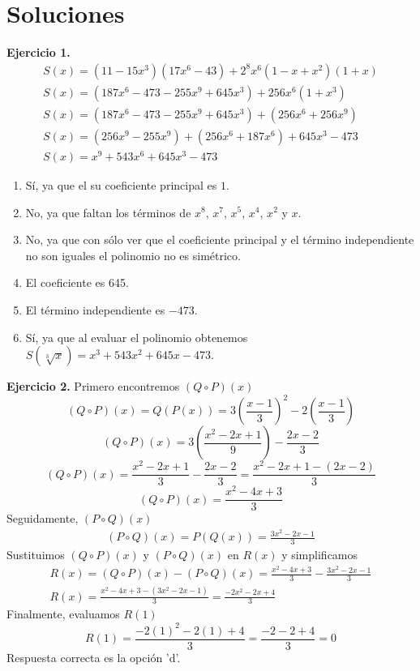 \newpage

\section*{\large Soluciones}
{
    \textbf{Ejercicio 1.}
    \begin{gather*}
        S(x) = (11 - 15x^3)(17x^6 - 43) + 2^8 x^6 (1 - x + x^2)(1 + x)\\
        S(x) = (187 x^6 - 473 - 255x^9 + 645x^3) + 256 x^6 (1 + x^3)\\
        S(x) = (187 x^6 - 473 - 255x^9 + 645x^3) + (256 x^6 + 256 x^9)\\
        S(x) = (256 x^9 - 255x^9) + (256 x^6 + 187 x^6) + 645x^3 - 473\\
        S(x) = x^9 + 543 x^6 + 645x^3 - 473
    \end{gather*}

        \begin{enumerate}
            \item Sí, ya que el su coeficiente principal es $1$.
            \item No, ya que faltan los términos de $x^8$, $x^7$, $x^5$, $x^4$, $x^2$ y $x$.
            \item No, ya que con sólo ver que el coeficiente principal y el término independiente no son iguales el polinomio no es simétrico.
            \item El coeficiente es 645.
            \item El término independiente es $-473$.
            \item Sí, ya que al evaluar el polinomio obtenemos $S(\sqrt[3]{x}) = x^3 + 543 x^2 + 645x - 473$.
        \end{enumerate}

    \textbf{Ejercicio 2.} Primero encontremos $(Q \circ P)(x)$
    \[ (Q \circ P)(x) = Q(P(x)) = 3\left( \frac{x - 1}{3} \right)^2 - 2\left( \frac{x - 1}{3} \right)\]
    \[ (Q \circ P)(x) = 3\left( \frac{x^2 - 2x + 1}{9} \right) - \frac{2x - 2}{3}\]
    \[ (Q \circ P)(x) = \frac{x^2 - 2x + 1}{3} - \frac{2x - 2}{3} = \frac{x^2 - 2x + 1 - (2x - 2)}{3}\]
    \[ (Q \circ P)(x) = \frac{x^2 - 4x + 3}{3}\]
    Seguidamente, $(P \circ Q)(x)$
    \begin{gather*}
        (P \circ Q)(x) = P(Q(x)) = \frac{3x^2 - 2x - 1}{3}
    \end{gather*}
    Sustituimos $(Q \circ P)(x)$ y $(P \circ Q)(x)$ en $R(x)$ y simplificamos
    \begin{gather*}
        R(x) = (Q \circ P)(x) - (P \circ Q)(x) = \frac{x^2 - 4x + 3}{3} -  \frac{3x^2 - 2x - 1}{3}\\
        R(x) = \frac{x^2 - 4x + 3 - (3x^2 - 2x - 1)}{3} = \frac{-2 x^2 - 2x + 4}{3}
    \end{gather*}
    Finalmente, evaluamos $R(1)$
    \[R(1) = \frac{-2 (1)^2 - 2(1) + 4}{3} = \frac{-2 - 2 + 4}{3} = 0\]
    Respuesta correcta es la opción 'd'.
}\label{sec:soluciones}
